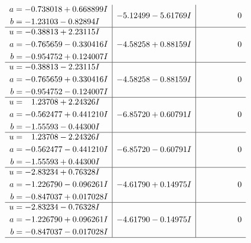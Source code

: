 \documentclass[1p]{elsarticle_modified}
\theoremstyle{definition}
\begin{document}
$$\begin{array}{c|c|c}
\begin{aligned}
a &= -0.738018 + 0.668899 I \\
b &= -1.23103 - 0.82894 I\end{aligned}
 & -5.12499 - 5.61769 I & \phantom{-0.000000 } 0 \\ \hline\begin{aligned}
u &= -0.38813 + 2.23115 I \\
a &= -0.765659 - 0.330416 I \\
b &= -0.954752 + 0.124007 I\end{aligned}
 & -4.58258 + 0.88159 I & \phantom{-0.000000 } 0 \\ \hline\begin{aligned}
u &= -0.38813 - 2.23115 I \\
a &= -0.765659 + 0.330416 I \\
b &= -0.954752 - 0.124007 I\end{aligned}
 & -4.58258 - 0.88159 I & \phantom{-0.000000 } 0 \\ \hline\begin{aligned}
u &= \phantom{-}1.23708 + 2.24326 I \\
a &= -0.562477 + 0.441210 I \\
b &= -1.55593 - 0.44300 I\end{aligned}
 & -6.85720 + 0.60791 I & \phantom{-0.000000 } 0 \\ \hline\begin{aligned}
u &= \phantom{-}1.23708 - 2.24326 I \\
a &= -0.562477 - 0.441210 I \\
b &= -1.55593 + 0.44300 I\end{aligned}
 & -6.85720 - 0.60791 I & \phantom{-0.000000 } 0 \\ \hline\begin{aligned}
u &= -2.83234 + 0.76328 I \\
a &= -1.226790 - 0.096261 I \\
b &= -0.847037 + 0.017028 I\end{aligned}
 & -4.61790 + 0.14975 I & \phantom{-0.000000 } 0 \\ \hline\begin{aligned}
u &= -2.83234 - 0.76328 I \\
a &= -1.226790 + 0.096261 I \\
b &= -0.847037 - 0.017028 I\end{aligned}
 & -4.61790 - 0.14975 I & \phantom{-0.000000 } 0\\
 \hline 
 \end{array}$$\newpage\newpage\renewcommand{\arraystretch}{1}
\end{document}

